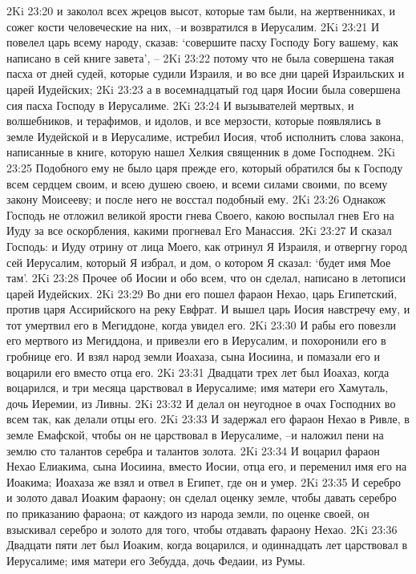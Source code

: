 2Ki 23:20  и заколол всех жрецов высот, которые там были, на жертвенниках, и сожег кости человеческие на них, --и возвратился в Иерусалим.
2Ki 23:21  И повелел царь всему народу, сказав: `совершите пасху Господу Богу вашему, как написано в сей книге завета', --
2Ki 23:22  потому что не была совершена такая пасха от дней судей, которые судили Израиля, и во все дни царей Израильских и царей Иудейских;
2Ki 23:23  а в восемнадцатый год царя Иосии была совершена сия пасха Господу в Иерусалиме.
2Ki 23:24  И вызывателей мертвых, и волшебников, и терафимов, и идолов, и все мерзости, которые появлялись в земле Иудейской и в Иерусалиме, истребил Иосия, чтоб исполнить слова закона, написанные в книге, которую нашел Хелкия священник в доме Господнем.
2Ki 23:25  Подобного ему не было царя прежде его, который обратился бы к Господу всем сердцем своим, и всею душею своею, и всеми силами своими, по всему закону Моисееву; и после него не восстал подобный ему.
2Ki 23:26  Однакож Господь не отложил великой ярости гнева Своего, какою воспылал гнев Его на Иуду за все оскорбления, какими прогневал Его Манассия.
2Ki 23:27  И сказал Господь: и Иуду отрину от лица Моего, как отринул Я Израиля, и отвергну город сей Иерусалим, который Я избрал, и дом, о котором Я сказал: `будет имя Мое там'.
2Ki 23:28  Прочее об Иосии и обо всем, что он сделал, написано в летописи царей Иудейских.
2Ki 23:29  Во дни его пошел фараон Нехао, царь Египетский, против царя Ассирийского на реку Евфрат. И вышел царь Иосия навстречу ему, и тот умертвил его в Мегиддоне, когда увидел его.
2Ki 23:30  И рабы его повезли его мертвого из Мегиддона, и привезли его в Иерусалим, и похоронили его в гробнице его. И взял народ земли Иоахаза, сына Иосиина, и помазали его и воцарили его вместо отца его.
2Ki 23:31  Двадцати трех лет был Иоахаз, когда воцарился, и три месяца царствовал в Иерусалиме; имя матери его Хамуталь, дочь Иеремии, из Ливны.
2Ki 23:32  И делал он неугодное в очах Господних во всем так, как делали отцы его.
2Ki 23:33  И задержал его фараон Нехао в Ривле, в земле Емафской, чтобы он не царствовал в Иерусалиме, --и наложил пени на землю сто талантов серебра и талантов золота.
2Ki 23:34  И воцарил фараон Нехао Елиакима, сына Иосиина, вместо Иосии, отца его, и переменил имя его на Иоакима; Иоахаза же взял и отвел в Египет, где он и умер.
2Ki 23:35  И серебро и золото давал Иоаким фараону; он сделал оценку земле, чтобы давать серебро по приказанию фараона; от каждого из народа земли, по оценке своей, он взыскивал серебро и золото для того, чтобы отдавать фараону Нехао.
2Ki 23:36  Двадцати пяти лет был Иоаким, когда воцарился, и одиннадцать лет царствовал в Иерусалиме; имя матери его Зебудда, дочь Федаии, из Румы.

